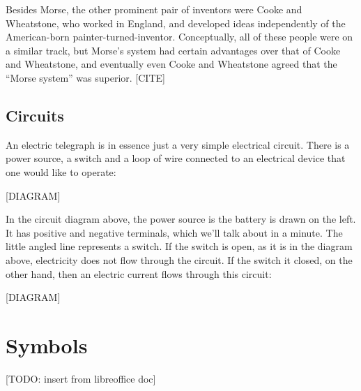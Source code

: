 \documentclass{book}
\begin{document}
Besides Morse, the other prominent pair of inventors were Cooke and Wheatstone, who worked in England, and developed ideas independently of the American-born painter-turned-inventor. Conceptually, all of these people were on a similar track, but Morse's system had certain advantages over that of Cooke and Wheatstone, and eventually even Cooke and Wheatstone agreed that the “Morse system” was superior. [CITE]

\section{Circuits}

An electric telegraph is in essence just a very simple electrical circuit. There is a power source, a switch and a loop of wire connected to an electrical device that one would like to operate:

[DIAGRAM]

In the circuit diagram above, the power source is the battery is drawn on the left. It has positive and negative terminals, which we'll talk about in a minute. The little angled line represents a switch. If the switch is open, as it is in the diagram above, electricity does not flow through the circuit. If the switch it closed, on the other hand, then an electric current flows through this circuit:

[DIAGRAM]


\chapter{Symbols}

[TODO: insert from libreoffice doc]
\end{document}
